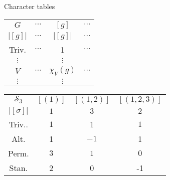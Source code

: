 \documentclass[10pt]{beamer}
\newcommand{\Sym}{\mathcal{S}}
\begin{document}
	\begin{frame}{Character tables} 
		\begin{definition}
			\begin{table}[hbt!]
				\centering
				\parbox[t]{.45\linewidth}{
					\centering
					\begin{tabular}{c | c c c }
						$G$    & $\cdots $ & $[g]$        & $\cdots$ \\ 
						$|[g]|$ & $\cdots$ & $|[g]|$ & $\cdots$ \\ \hline
						Triv.   & $\cdots$  & 1            & $\cdots$ \\
						$\vdots$ &           & $\vdots$     &          \\
						$V$    & $\cdots$  & $\chi_V(g) $ & $\cdots$ \\
						$\vdots$ &           & $\vdots$     &
					\end{tabular}
				}\pause
				\hfill
				\parbox[t]{.45\linewidth}{
					\centering
					\begin{tabular}{c | c c c }
						$\Sym_3$  & $[(1)]$ & $[(1,2)]$ & $[(1,2,3)]$ \\ 
						$|[\sigma]|$ & $1$ & $3$ & $2$ \\ \hline
						Triv.. & $1$     & 1         & $1$       \\
						Alt.  & 1       & $-1$      & 1         \\
						Perm. & $3$     & $1$       & $0$       \\
						Stan. & 2       & 0         & -1        
					\end{tabular}
				}
			\end{table}
		\end{definition}
	\end{frame}
	
\end{document}
